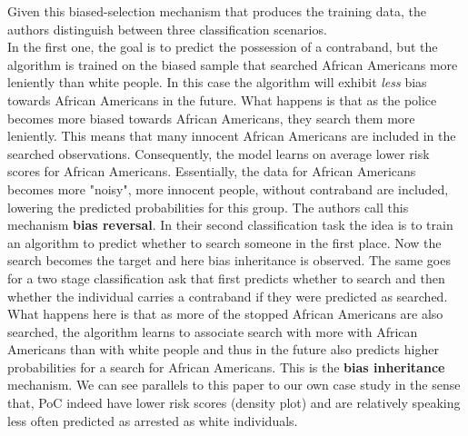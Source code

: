 Given this biased-selection mechanism that produces the training data, the authors distinguish between three classification scenarios.\\
In the first one, the goal is to predict the possession of a contraband, but the algorithm is trained on the biased sample that searched African Americans more leniently than white people. In this case the algorithm will exhibit \textit{less} bias towards African Americans in the future. What happens is that as the police becomes more biased towards African Americans, they search them more leniently. This means that many innocent African Americans are included in the searched observations. Consequently, the model learns on average lower risk scores for African Americans. Essentially, the data for African Americans becomes more "noisy", more innocent people, without contraband are included, lowering the predicted probabilities for this group. The authors call this mechanism \textbf{bias reversal}.
In their second classification task the idea is to train an algorithm to predict whether to search someone in the first place. Now the search becomes the target and here bias inheritance is observed. The same goes for a two stage classification ask that first predicts whether to search and then whether the individual carries a contraband if they were predicted as searched. What happens here is that as more of the stopped African Americans are also searched, the algorithm learns to associate search with more with African Americans than with white people and thus in the future also predicts higher probabilities for a search for African Americans. This is the \textbf{bias inheritance} mechanism.
We can see parallels to this paper to our own case study in the sense that, PoC indeed have lower risk scores (density plot) and are relatively speaking less often predicted as arrested as white individuals.



